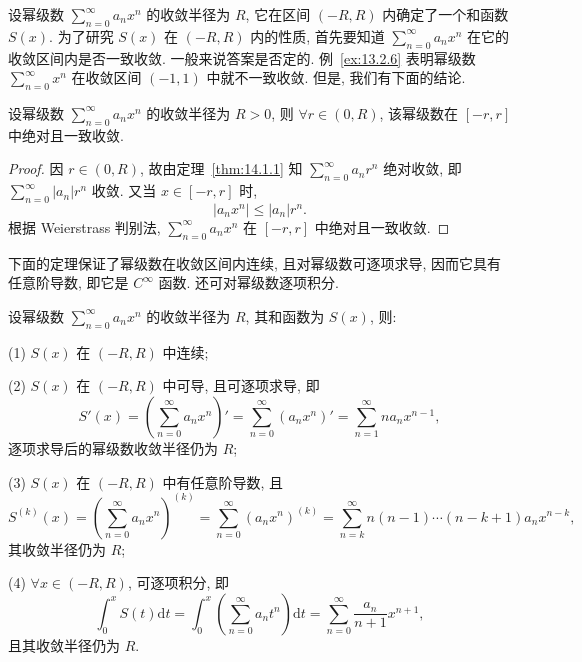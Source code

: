 设幂级数 $\sum_{n=0}^{\infty}a_{n}x^{n}$ 的收敛半径为 $R$, 它在区间 $(-R,R)$ 内确定了一个和函数 $S(x)$. 为了研究 $S(x)$ 在 $(-R,R)$ 内的性质, 首先要知道 $\sum_{n=0}^{\infty}a_{n}x^{n}$ 在它的收敛区间内是否一致收敛. 一般来说答案是否定的. 例~\ref{ex:13.2.6} 表明幂级数 $\sum_{n=0}^{\infty}x^{n}$ 在收敛区间 $(-1,1)$ 中就不一致收敛. 但是, 我们有下面的结论.

\begin{theorem}\label{thm:14.1.3}
设幂级数 $\sum_{n=0}^{\infty}a_{n}x^{n}$ 的收敛半径为 $R>0$, 则 $\forall r\in(0,R)$, 该幂级数在 $[-r,r]$ 中绝对且一致收敛.
\end{theorem}

\begin{proof}
因 $r\in(0,R)$, 故由定理~\ref{thm:14.1.1} 知 $\sum_{n=0}^{\infty}a_{n}r^{n}$ 绝对收敛, 即 $\sum_{n=0}^{\infty}|a_{n}|r^{n}$ 收敛. 又当 $x\in[-r,r]$ 时,
\[
  |a_{n}x^{n}|\leqslant|a_{n}|r^{n}.
\]
根据 Weierstrass 判别法, $\sum_{n=0}^{\infty}a_{n}x^{n}$ 在 $[-r,r]$ 中绝对且一致收敛.
\end{proof}

下面的定理保证了幂级数在收敛区间内连续, 且对幂级数可逐项求导, 因而它具有任意阶导数, 即它是 $C^{\infty}$ 函数. 还可对幂级数逐项积分.

\begin{theorem}[幂级数的重要性性质]\label{thm:14.1.4}
设幂级数 $\sum_{n=0}^{\infty}a_{n}x^{n}$ 的收敛半径为 $R$, 其和函数为 $S(x)$, 则:

(1) $S(x)$ 在 $(-R,R)$ 中连续;

(2) $S(x)$ 在 $(-R,R)$ 中可导, 且可逐项求导, 即
\[
  S'(x)=\left(\sum_{n=0}^{\infty}a_{n}x^{n}\right)'=\sum_{n=0}^{\infty}(a_{n}x^{n})'=\sum_{n=1}^{\infty}na_{n}x^{n-1},
\]
逐项求导后的幂级数收敛半径仍为 $R$;

(3) $S(x)$ 在 $(-R,R)$ 中有任意阶导数, 且
\[
  S^{(k)}(x)=\left(\sum_{n=0}^{\infty}a_{n}x^{n}\right)^{(k)}=\sum_{n=0}^{\infty}(a_{n}x^{n})^{(k)}=\sum_{n=k}^{\infty}n(n-1)\cdots(n-k+1)a_{n}x^{n-k},
\]
其收敛半径仍为 $R$;

(4) $\forall x\in(-R,R)$, 可逐项积分, 即
\[
  \int_{0}^{x}S(t)\mathrm{d}t=\int_{0}^{x}\left(\sum_{n=0}^{\infty}a_{n}t^{n}\right)\mathrm{d}t=\sum_{n=0}^{\infty}\frac{a_{n}}{n+1}x^{n+1},
\]
且其收敛半径仍为 $R$.
\end{theorem}

